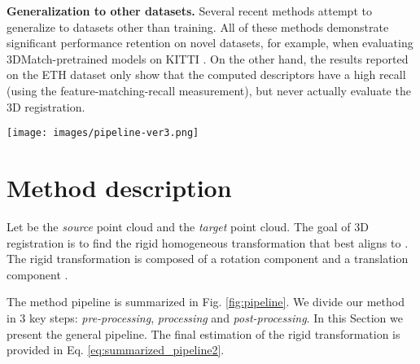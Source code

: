 \documentclass{bmvc2k}
\begin{document}
\textbf{Generalization to other datasets.} Several recent methods \cite{SpinNet, DIP, PointDSC} attempt to generalize to datasets other than training. All of these methods demonstrate significant performance retention on novel datasets, for example, when evaluating 3DMatch-pretrained models on KITTI \cite{SpinNet, PointDSC}. On the other hand, the results reported on the ETH dataset only show that the computed descriptors have a high recall \cite{SpinNet,d3feat-joint-learning-of-dense-features,DIP} (using the feature-matching-recall measurement), but never actually evaluate the 3D registration.

\begin{figure*}[t!]
\begin{center}
\texttt{[image: images/pipeline-ver3.png]}
\end{center}
   \caption{The proposed pipeline. The method is divided into 3 steps: \textit{pre-processing}, \textit{processing} and \textit{post-processing}. Each step follows the previous one. The \textit{pre-processing} step prepares the initial data and outputs  voxelized source volumes and one target volume. The \textit{processing} step performs the 3D cross-correlation over each source volume and the target volume. The cross-correlation volumes  are heatmaps that should indicate higher (indicated in yellow on the volumes) or lower (indicated with purple on the volumes) matching between the source  and target  volumes at the corresponding voxels. White spaces are present because the cross-correlations values are clipped so only the upper range is visible. Finally, the \textit{post-processing} step finds the solution from the output volumes by finding the maximal cross-correlation from all the given volumes.}
\label{fig:pipeline}
\end{figure*}

\section{Method description} \label{sec:method-description}

Let  be the \textit{source} point cloud and  the \textit{target} point cloud. The goal of 3D registration is to find the rigid homogeneous transformation  that best aligns  to . The rigid transformation  is composed of a rotation component  and a translation component .

The method pipeline is summarized in Fig. \ref{fig:pipeline}. We divide our method in 3 key steps: \textit{pre-processing}, \textit{processing} and \textit{post-processing}. In this Section we present the general pipeline. The final estimation of the rigid transformation is provided in Eq. \ref{eq:summarized_pipeline2}.
\end{document}
